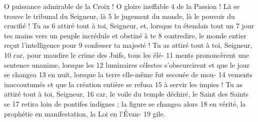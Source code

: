 O puissance admirable de la Croix ! O gloire ineffable	 
4	 	de la Passion ! Là se trouve le tribunal du Seigneur, là	 
5	 	le jugement du monde, là le pouvoir du crucifié ! Tu as	 
6	 	attiré tout à toi, Seigneur, et, lorsque tu étendais tout un	 
7	 	jour tes mains vers un peuple incrédule et obstiné à te	 
8	 	contredire, le monde entier reçut l'intelligence pour	 
9	 	confesser ta majesté ! Tu as attiré tout à toi, Seigneur,	 
10	 	car, pour maudire le crime des Juifs, tous les élé-	 
11	 	ments prononcèrent une sentence unanime, lorsque les	 
12	 	luminaires célestes s'obscurcirent et que le jour se changea	 
13	 	en nuit, lorsque la terre elle-même fut secouée de mou-	 
14	 	vements inaccoutumés et que la création entière se refusa	 
15	 	à servir les impies ! Tu as attiré tout à toi, Seigneur,	 
16	 	car, le voile du temple déchiré, le Saint des Saints se	 
17	 	retira loin de pontifes indignes ; la figure se changea alors	 
18	 	en vérité, la prophétie en manifestation, la Loi en l'Évan-	 
19	 	gile.